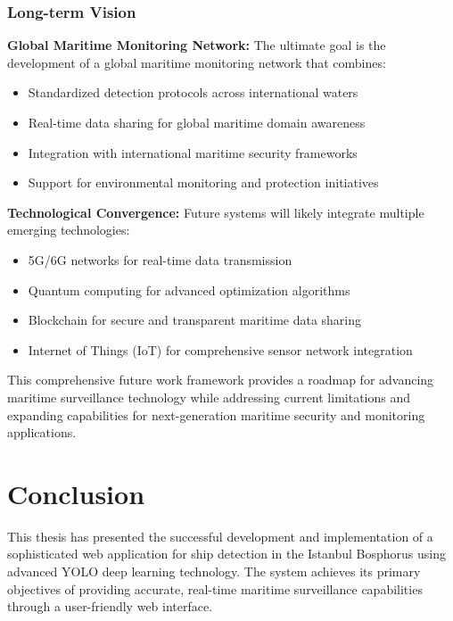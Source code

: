 \documentclass[12pt,a4paper]{report}
\begin{document}
\subsection{Long-term Vision}

\textbf{Global Maritime Monitoring Network:}
The ultimate goal is the development of a global maritime monitoring network that combines:
\begin{itemize}
    \item Standardized detection protocols across international waters
    \item Real-time data sharing for global maritime domain awareness
    \item Integration with international maritime security frameworks
    \item Support for environmental monitoring and protection initiatives
\end{itemize}

\textbf{Technological Convergence:}
Future systems will likely integrate multiple emerging technologies:
\begin{itemize}
    \item 5G/6G networks for real-time data transmission
    \item Quantum computing for advanced optimization algorithms
    \item Blockchain for secure and transparent maritime data sharing
    \item Internet of Things (IoT) for comprehensive sensor network integration
\end{itemize}

This comprehensive future work framework provides a roadmap for advancing maritime surveillance technology while addressing current limitations and expanding capabilities for next-generation maritime security and monitoring applications.

\chapter{Conclusion}

This thesis has presented the successful development and implementation of a sophisticated web application for ship detection in the Istanbul Bosphorus using advanced YOLO deep learning technology. The system achieves its primary objectives of providing accurate, real-time maritime surveillance capabilities through a user-friendly web interface.
\end{document}
